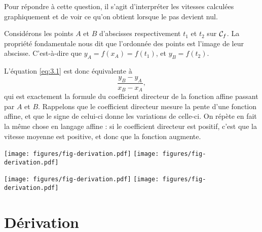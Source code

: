 Pour répondre à cette question, il s'agit d'interpréter les vitesses calculées graphiquement et de voir ce qu'on obtient lorsque le pas devient nul.

Considérons les points $A$ et $B$ d'abscisses respectivement $t_1$ et $t_2$ sur $\mathcal{C}_f$.
La propriété fondamentale nous dit que l'ordonnée des points est l'image de leur abscisse.
C'est-à-dire que $y_A = f(x_A) = f(t_1)$, et $y_B = f(t_2)$.

L'équation \eqref{eq:3.1} est donc équivalente à
	\[ \dfrac{y_B - y_A}{x_B - x_A}, \]
qui est exactement la formule du coefficient directeur de la fonction affine passant par $A$ et $B$.
Rappelons que le coefficient directeur mesure la pente d'une fonction affine, et que le signe de celui-ci donne les variations de celle-ci.
On répète en fait la même chose en langage affine : si le coefficient directeur est positif, c'est que la vitesse moyenne est positive, et donc que la fonction augmente.

	\begin{center}
	\begin{multicols}{2}
	\texttt{[image: figures/fig-derivation.pdf]}
	\texttt{[image: figures/fig-derivation.pdf]}
	
	\hfill
	\texttt{[image: figures/fig-derivation.pdf]}
	\texttt{[image: figures/fig-derivation.pdf]}
	 \end{multicols}
	 \end{center}


\section{Dérivation}



